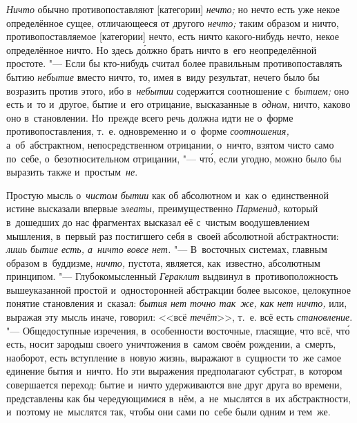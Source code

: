 {\em Ничто} обычно противопоставляют [категории] {\em нечто;} но нечто есть
уже некое определённое сущее, отличающееся от другого {\em нечто;} таким образом
и ничто, противопоставляемое [категории] нечто, есть ничто какого-нибудь нечто,
некое определённое ничто. Но здесь д\'{о}лжно брать ничто в~его неопределённой
простоте. "--- Если бы кто-нибудь считал более правильным противопоставлять бытию
{\em небытие} вместо ничто, то, имея в~виду результат, нечего было бы возразить
против этого, ибо в~{\em небытии} содержится соотношение с~{\em бытием;} оно
есть и~то и~другое, бытие и~его отрицание, высказанные в~{\em одном,} ничто,
каково оно в~становлении. Но~прежде всего речь должна идти не о~форме
противопоставления, т.~е. одновременно и~о~форме {\em соотношения,}
а~об~абстрактном, непосредственном отрицании, о~ничто, взятом чисто само
по~себе, о~безотносительном отрицании, "--- чт\'{о}, если угодно, можно было бы
выразить также и~простым~{\em не}.

Простую мысль о~{\em чистом бытии} как об абсолютном и~как о~единственной
истине высказали впервые {\em элеаты,} преимущественно {\em Парменид,} который
в~дошедших до нас фрагментах высказал её с~чистым воодушевлением мышления,
в~первый раз постигшего себя в~своей абсолютной абстрактности:
{\em лишь бытие есть, а~ничто вовсе нет.} "--- В~восточных системах, главным
образом в~буддизме, {\em ничто,} пустота, является, как~известно, абсолютным
принципом. "--- Глубокомысленный {\em Гераклит} выдвинул в~противоположность
вышеуказанной простой и~односторонней абстракции более высокое, целокупное
понятие становления и~сказал: {\em бытия нет точно так~же, как нет ничто,} или,
выражая эту мысль иначе, говорил: <<всё {\em течёт}>>, т.~е. всё есть
{\em становление}. "--- Общедоступные изречения, в~особенности восточные,
гласящие, что всё, чт\'{о} есть, носит зародыш своего уничтожения в~самом своём
рождении, а~смерть, наоборот, есть вступление в~новую жизнь, выражают
в~сущности то~же самое единение бытия и~ничто. Но эти выражения предполагают
субстрат, в~котором совершается переход: бытие и~ничто удерживаются вне друг
друга во времени, представлены как бы чередующимися в~нём, а~не~мыслятся в~их
абстрактности, и~поэтому не~мыслятся так, чтобы они сами по~себе были одним и
тем~же.

